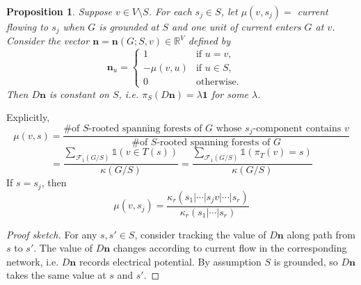 \documentclass{amsart}
\newtheorem{prop}[thm]{Proposition}
\theoremstyle{definition}
\newcommand{\RR}{\mathbb{R}}
\newcommand{\trees}{\mathcal{F}_1}
\begin{document}
\begin{prop}
\label{prop:n-vector}
Suppose $v \in V \setminus S$.
For each $s_j \in S$, let $\mu(v,s_j) = $ current flowing to $s_j$
when 
$G$ is grounded at $S$
and 
one unit of current enters $G$ at $v$.
Consider the vector $\mathbf{n} = \mathbf{n}(G;S,v) \in \RR^V$ defined by
\[
	\mathbf{n}_u = \begin{cases}
	1 &\text{if } u = v, \\
	-\mu(v,u) &\text{if } u \in S, \qquad \\
	0 &\text{otherwise}.
	\end{cases}
\]
Then $D\mathbf{n}$ is constant on $S$, i.e. $\pi_S( D \mathbf{n}) = \lambda \mathbf{1}$ for some $\lambda$.
\end{prop}
Explicitly,
\begin{equation*}
\mu(v,s) =  \frac{\text{\# of $S$-rooted spanning forests of $G$ whose $s_j$-component contains $v$}}{\text{\# of $S$-rooted spanning forests of $G$}}
\end{equation*}
\[
= \frac{\sum_{\trees(G/S)} \mathds{1}(v \in T(s))}{\kappa(G/S)}
= \frac{\sum_{\trees(G/S)} \mathds{1}(\pi_T(v) = s)}{\kappa(G/S)}
\]
If $s = s_j$, then
\[
	\mu(v, s_j) = \frac{\kappa_{r}(s_1|\cdots|s_j v| \cdots|s_r)}{\kappa_r(s_1|\cdots|s_r)}
\]

\begin{proof}[Proof sketch]
For any $s, s' \in S$, consider tracking the value of $D \mathbf{n}$ along path from $s$ to $s'$. 
The value of $D \mathbf{n}$ changes according to current flow in the corresponding network, i.e. $D \mathbf{n}$ records electrical potential.
By assumption $S$ is grounded, so $D\mathbf{n}$ takes the same value at $s$ and $s'$.
\end{proof}
\end{document}
